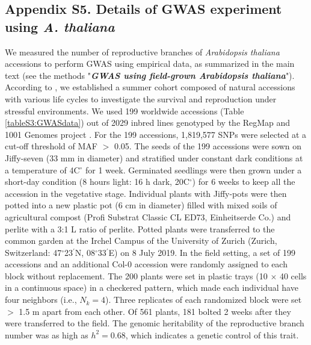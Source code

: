 \documentclass[12pt,]{article}
\begin{document}
\subsection*{Appendix S5. Details of GWAS experiment using \textit{A. thaliana}}
We measured the number of reproductive branches of \textit{Arabidopsis thaliana} accessions to perform GWAS using empirical data, as summarized in the main text (see the methods "\textit{\textbf{GWAS using field-grown Arabidopsis thaliana}}"). According to \cite{sato2019plant}, we established a summer cohort composed of natural accessions with various life cycles to investigate the survival and reproduction under stressful environments. We used 199 worldwide accessions (Table \ref{tableS3:GWASdata}) out of 2029 inbred lines genotyped by the RegMap \citep{horton_genome-wide_2012} and 1001 Genomes project \citep{alonso-blanco_1135_2016}. For the 199 accessions, 1,819,577 SNPs were selected at a cut-off threshold of MAF $>$ 0.05. The seeds of the 199 accessions were sown on Jiffy-seven (33 mm in diameter) and stratified under constant dark conditions at a temperature of 4C$^{\circ}$ for 1 week. Germinated seedlings were then grown under a short-day condition (8 hours light: 16 h dark, 20C$^{\circ}$) for 6 weeks to keep all the accession in the vegetative stage. Individual plants with Jiffy-pots were then potted into a new plastic pot (6 cm in diameter) filled with mixed soils of agricultural compost (Profi Substrat Classic CL ED73, Einheitserde Co.) and perlite with a 3:1 L ratio of perlite. Potted plants were transferred to the common garden at the Irchel Campus of the University of Zurich (Zurich, Switzerland: 47$^\circ$23$^\prime$N, 08$^\circ$33$^\prime$E) on 8 July 2019. In the field setting, a set of 199 accessions and an additional Col-0 accession were randomly assigned to each block without replacement. The 200 plants were set in plastic trays (10 $\times$ 40 cells in a continuous space) in a checkered pattern, which made each individual have four neighbors (i.e., $N_k = 4$). Three replicates of each randomized block were set $>$ 1.5 m apart from each other. Of 561 plants, 181 bolted 2 weeks after they were transferred to the field. The genomic heritability of the reproductive branch number was as high as $h^2 = 0.68$, which indicates a genetic control of this trait.
\end{document}

